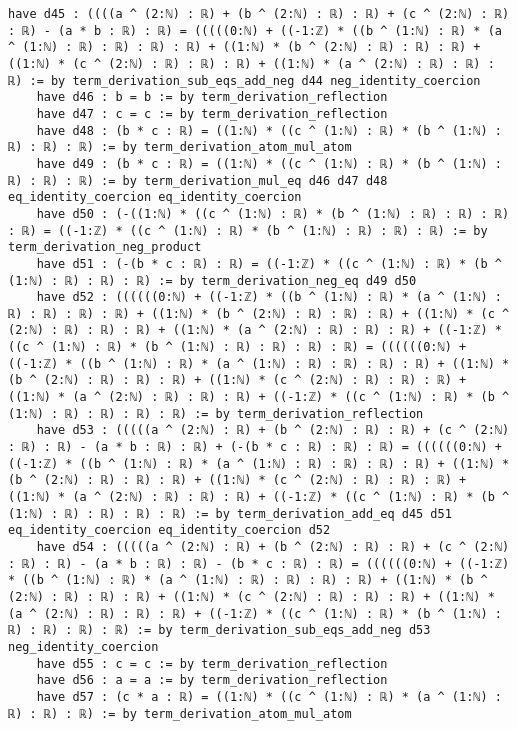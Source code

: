 \documentclass{article}
\begin{document}
\begin{tcolorbox}[colback=white!10, width=\linewidth]
\begin{lstlisting}[language=Lean4]
    have d45 : ((((a ^ (2:ℕ) : ℝ) + (b ^ (2:ℕ) : ℝ) : ℝ) + (c ^ (2:ℕ) : ℝ) : ℝ) - (a * b : ℝ) : ℝ) = (((((0:ℕ) + ((-1:ℤ) * ((b ^ (1:ℕ) : ℝ) * (a ^ (1:ℕ) : ℝ) : ℝ) : ℝ) : ℝ) + ((1:ℕ) * (b ^ (2:ℕ) : ℝ) : ℝ) : ℝ) + ((1:ℕ) * (c ^ (2:ℕ) : ℝ) : ℝ) : ℝ) + ((1:ℕ) * (a ^ (2:ℕ) : ℝ) : ℝ) : ℝ) := by term_derivation_sub_eqs_add_neg d44 neg_identity_coercion
    have d46 : b = b := by term_derivation_reflection
    have d47 : c = c := by term_derivation_reflection
    have d48 : (b * c : ℝ) = ((1:ℕ) * ((c ^ (1:ℕ) : ℝ) * (b ^ (1:ℕ) : ℝ) : ℝ) : ℝ) := by term_derivation_atom_mul_atom
    have d49 : (b * c : ℝ) = ((1:ℕ) * ((c ^ (1:ℕ) : ℝ) * (b ^ (1:ℕ) : ℝ) : ℝ) : ℝ) := by term_derivation_mul_eq d46 d47 d48 eq_identity_coercion eq_identity_coercion
    have d50 : (-((1:ℕ) * ((c ^ (1:ℕ) : ℝ) * (b ^ (1:ℕ) : ℝ) : ℝ) : ℝ) : ℝ) = ((-1:ℤ) * ((c ^ (1:ℕ) : ℝ) * (b ^ (1:ℕ) : ℝ) : ℝ) : ℝ) := by term_derivation_neg_product
    have d51 : (-(b * c : ℝ) : ℝ) = ((-1:ℤ) * ((c ^ (1:ℕ) : ℝ) * (b ^ (1:ℕ) : ℝ) : ℝ) : ℝ) := by term_derivation_neg_eq d49 d50
    have d52 : ((((((0:ℕ) + ((-1:ℤ) * ((b ^ (1:ℕ) : ℝ) * (a ^ (1:ℕ) : ℝ) : ℝ) : ℝ) : ℝ) + ((1:ℕ) * (b ^ (2:ℕ) : ℝ) : ℝ) : ℝ) + ((1:ℕ) * (c ^ (2:ℕ) : ℝ) : ℝ) : ℝ) + ((1:ℕ) * (a ^ (2:ℕ) : ℝ) : ℝ) : ℝ) + ((-1:ℤ) * ((c ^ (1:ℕ) : ℝ) * (b ^ (1:ℕ) : ℝ) : ℝ) : ℝ) : ℝ) = ((((((0:ℕ) + ((-1:ℤ) * ((b ^ (1:ℕ) : ℝ) * (a ^ (1:ℕ) : ℝ) : ℝ) : ℝ) : ℝ) + ((1:ℕ) * (b ^ (2:ℕ) : ℝ) : ℝ) : ℝ) + ((1:ℕ) * (c ^ (2:ℕ) : ℝ) : ℝ) : ℝ) + ((1:ℕ) * (a ^ (2:ℕ) : ℝ) : ℝ) : ℝ) + ((-1:ℤ) * ((c ^ (1:ℕ) : ℝ) * (b ^ (1:ℕ) : ℝ) : ℝ) : ℝ) : ℝ) := by term_derivation_reflection
    have d53 : (((((a ^ (2:ℕ) : ℝ) + (b ^ (2:ℕ) : ℝ) : ℝ) + (c ^ (2:ℕ) : ℝ) : ℝ) - (a * b : ℝ) : ℝ) + (-(b * c : ℝ) : ℝ) : ℝ) = ((((((0:ℕ) + ((-1:ℤ) * ((b ^ (1:ℕ) : ℝ) * (a ^ (1:ℕ) : ℝ) : ℝ) : ℝ) : ℝ) + ((1:ℕ) * (b ^ (2:ℕ) : ℝ) : ℝ) : ℝ) + ((1:ℕ) * (c ^ (2:ℕ) : ℝ) : ℝ) : ℝ) + ((1:ℕ) * (a ^ (2:ℕ) : ℝ) : ℝ) : ℝ) + ((-1:ℤ) * ((c ^ (1:ℕ) : ℝ) * (b ^ (1:ℕ) : ℝ) : ℝ) : ℝ) : ℝ) := by term_derivation_add_eq d45 d51 eq_identity_coercion eq_identity_coercion d52
    have d54 : (((((a ^ (2:ℕ) : ℝ) + (b ^ (2:ℕ) : ℝ) : ℝ) + (c ^ (2:ℕ) : ℝ) : ℝ) - (a * b : ℝ) : ℝ) - (b * c : ℝ) : ℝ) = ((((((0:ℕ) + ((-1:ℤ) * ((b ^ (1:ℕ) : ℝ) * (a ^ (1:ℕ) : ℝ) : ℝ) : ℝ) : ℝ) + ((1:ℕ) * (b ^ (2:ℕ) : ℝ) : ℝ) : ℝ) + ((1:ℕ) * (c ^ (2:ℕ) : ℝ) : ℝ) : ℝ) + ((1:ℕ) * (a ^ (2:ℕ) : ℝ) : ℝ) : ℝ) + ((-1:ℤ) * ((c ^ (1:ℕ) : ℝ) * (b ^ (1:ℕ) : ℝ) : ℝ) : ℝ) : ℝ) := by term_derivation_sub_eqs_add_neg d53 neg_identity_coercion
    have d55 : c = c := by term_derivation_reflection
    have d56 : a = a := by term_derivation_reflection
    have d57 : (c * a : ℝ) = ((1:ℕ) * ((c ^ (1:ℕ) : ℝ) * (a ^ (1:ℕ) : ℝ) : ℝ) : ℝ) := by term_derivation_atom_mul_atom

\end{lstlisting}
\end{tcolorbox}
\end{document}
